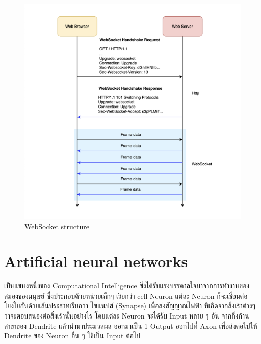 \begin{figure}[h]
  \begin{center}

    \includegraphics[scale=0.3]{pic/websocket-works-2.png}
  \end{center}

  \caption[WebSocket structure]{WebSocket structure}
  \label{fig:WebSocket structure}
\end{figure}

\newpage


\section{Artificial neural networks \cite{ANN}}
\par เป็นแขนงหนึ่งของ Computational Intelligence ซึ่งได้รับแรงบรรดาลใจมาจากการทำงานของสมองของมนุษย์
ซึ่งประกอบด้วยหน่วยเล็กๆ เรียกว่า cell Neuron แต่ละ Neuron ก็จะเชื่อมต่อโยงใยกันด้วยเส้นประสาทเรียกว่า ไซแนปส์ (Synapse) เพื่อส่งสัญญาณไฟฟ้า ที่เกิดจากสิ่งเร้าต่างๆ ว่าจะตอบสนองต่อสิ่งเร้านั้นอย่างไร
โดยแต่ละ Neuron จะได้รับ Input หลาย ๆ อัน จากกิ่งก้านสาขาของ Dendrite แล้วนำมาประมวลผล ออกมาเป็น 1 Output ออกไปที่ Axon เพื่อส่งต่อไปให้ Dendrite ของ Neuron อื่น ๆ ใช้เป็น Input ต่อไป

